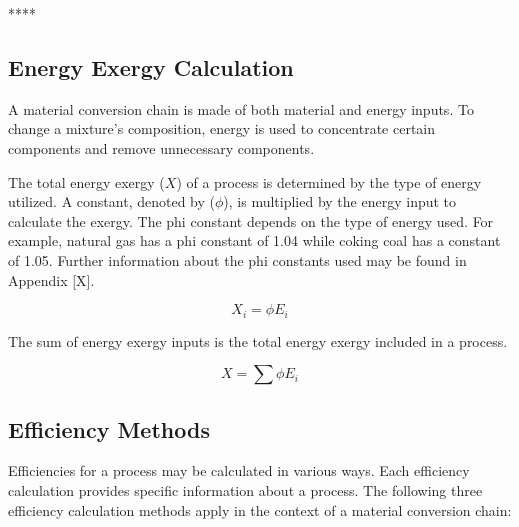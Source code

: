 \documentclass[energies,article,submit,pdftex,moreauthors]{Definitions/mdpi}
\begin{document}
****



\subsection{Energy Exergy Calculation}
\label{ssec: energy exergy calculation}

A material conversion chain
is made of both material and energy inputs.
To change a mixture's composition,
energy is used
to concentrate certain components
and remove unnecessary components.

The total energy exergy ($X$)
of a process
is determined by the type of energy utilized.
A constant, denoted by ($\phi$),
is multiplied by the energy input
to calculate the exergy.
The phi constant depends on the type of energy used.
For example, natural gas has a phi constant of 1.04
while coking coal has a constant of 1.05.
Further information about the phi constants used
may be found in Appendix [X].

\begin{equation}\label{eq:energy_exergy_definition}
  X_{i} = \phi E_{i}
\end{equation}

The sum of energy exergy inputs is the total energy exergy
included in a process.

\begin{equation}\label{eq:total_energy_exergy_definition}
  X = \sum{\phi E_{i}}
\end{equation}




\subsection{Efficiency Methods}
\label{ssec: efficiency_methods_and_calculations}

Efficiencies for a process may be calculated
in various ways.
Each efficiency calculation provides specific information
about a process.
The following three efficiency calculation methods apply
in the context of a material conversion chain:
\end{document}
